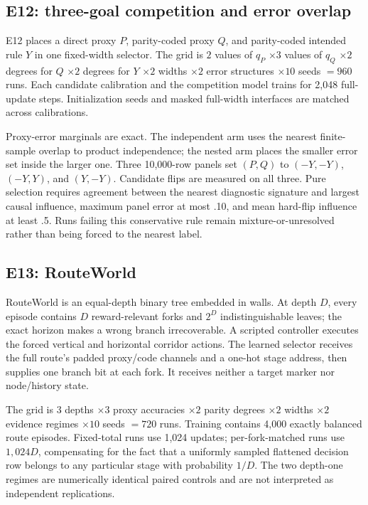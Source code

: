 \documentclass[11pt,a4paper]{article}
\begin{document}
\subsection{E12: three-goal competition and error overlap}

E12 places a direct proxy $P$, parity-coded proxy $Q$, and parity-coded intended rule $Y$ in one fixed-width selector. The grid is $2$ values of $q_P$ $\times3$ values of $q_Q$ $\times2$ degrees for $Q$ $\times2$ degrees for $Y$ $\times2$ widths $\times2$ error structures $\times10$ seeds $=960$ runs. Each candidate calibration and the competition model trains for 2,048 full-update steps. Initialization seeds and masked full-width interfaces are matched across calibrations.

Proxy-error marginals are exact. The independent arm uses the nearest finite-sample overlap to product independence; the nested arm places the smaller error set inside the larger one. Three 10,000-row panels set $(P,Q)$ to $(-Y,-Y)$, $(-Y,Y)$, and $(Y,-Y)$. Candidate flips are measured on all three. Pure selection requires agreement between the nearest diagnostic signature and largest causal influence, maximum panel error at most .10, and mean hard-flip influence at least .5. Runs failing this conservative rule remain mixture-or-unresolved rather than being forced to the nearest label.

\subsection{E13: RouteWorld}

RouteWorld is an equal-depth binary tree embedded in walls. At depth $D$, every episode contains $D$ reward-relevant forks and $2^D$ indistinguishable leaves; the exact horizon makes a wrong branch irrecoverable. A scripted controller executes the forced vertical and horizontal corridor actions. The learned selector receives the full route's padded proxy/code channels and a one-hot stage address, then supplies one branch bit at each fork. It receives neither a target marker nor node/history state.

The grid is $3$ depths $\times3$ proxy accuracies $\times2$ parity degrees $\times2$ widths $\times2$ evidence regimes $\times10$ seeds $=720$ runs. Training contains 4,000 exactly balanced route episodes. Fixed-total runs use 1,024 updates; per-fork-matched runs use $1{,}024D$, compensating for the fact that a uniformly sampled flattened decision row belongs to any particular stage with probability $1/D$. The two depth-one regimes are numerically identical paired controls and are not interpreted as independent replications.
\end{document}
